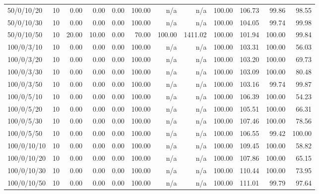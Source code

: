 \begin{table}[htbp]
{\begin{tabular}{lr*{10}{r}}
50/0/10/20 & 10 &  0.00 &  0.00 &  0.00 & 100.00 & n/a & n/a & 100.00 & 106.73 & 99.86 & 98.55 \\ 
50/0/10/30 & 10 &  0.00 &  0.00 &  0.00 & 100.00 & n/a & n/a & 100.00 & 104.05 & 99.74 & 99.98 \\ 
50/0/10/50 & 10 & 20.00 & 10.00 &  0.00 & 70.00 & 100.00 & 1411.02 & 100.00 & 101.94 & 100.00 & 99.84 \\ 
100/0/3/10 & 10 &  0.00 &  0.00 &  0.00 & 100.00 & n/a & n/a & 100.00 & 103.31 & 100.00 & 56.03 \\ 
100/0/3/20 & 10 &  0.00 &  0.00 &  0.00 & 100.00 & n/a & n/a & 100.00 & 103.20 & 100.00 & 69.73 \\ 
100/0/3/30 & 10 &  0.00 &  0.00 &  0.00 & 100.00 & n/a & n/a & 100.00 & 103.09 & 100.00 & 80.48 \\ 
100/0/3/50 & 10 &  0.00 &  0.00 &  0.00 & 100.00 & n/a & n/a & 100.00 & 103.16 & 99.74 & 99.87 \\ 
100/0/5/10 & 10 &  0.00 &  0.00 &  0.00 & 100.00 & n/a & n/a & 100.00 & 106.39 & 100.00 & 54.23 \\ 
100/0/5/20 & 10 &  0.00 &  0.00 &  0.00 & 100.00 & n/a & n/a & 100.00 & 105.51 & 100.00 & 66.31 \\ 
100/0/5/30 & 10 &  0.00 &  0.00 &  0.00 & 100.00 & n/a & n/a & 100.00 & 107.46 & 100.00 & 78.56 \\ 
100/0/5/50 & 10 &  0.00 &  0.00 &  0.00 & 100.00 & n/a & n/a & 100.00 & 106.55 & 99.42 & 100.00 \\ 
100/0/10/10 & 10 &  0.00 &  0.00 &  0.00 & 100.00 & n/a & n/a & 100.00 & 109.45 & 100.00 & 58.82 \\ 
100/0/10/20 & 10 &  0.00 &  0.00 &  0.00 & 100.00 & n/a & n/a & 100.00 & 107.86 & 100.00 & 65.15 \\ 
100/0/10/30 & 10 &  0.00 &  0.00 &  0.00 & 100.00 & n/a & n/a & 100.00 & 110.44 & 100.00 & 73.95 \\ 
100/0/10/50 & 10 &  0.00 &  0.00 &  0.00 & 100.00 & n/a & n/a & 100.00 & 111.01 & 99.79 & 97.64 \\ 
\bottomrule
\end{tabular}
}
\end{table}

